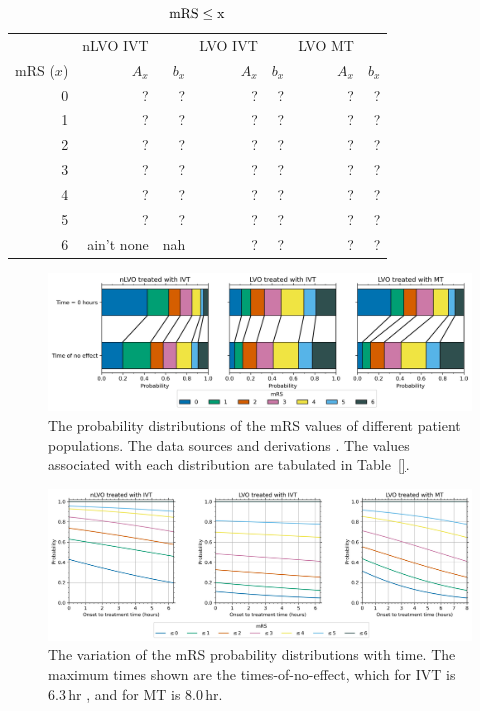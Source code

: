\begin{table}
    \centering
    \begin{tabular}{rrrrrrr}
        \hline 
        & nLVO IVT & & LVO IVT & & LVO MT & \\
        mRS ($x$) & $A_x$ & $b_x$ & $A_x$ & $b_x$ & $A_x$ & $b_x$ \\ 
        \hline 
        0 & ? & ? & ? & ?  & ? & ? \\
        1 & ? & ?  & ? & ?  & ? & ? \\
        2 & ? & ?  & ? & ?  & ? & ? \\
        3 & ? & ?  & ? & ?  & ? & ? \\
        4 & ? & ?  & ? & ?  & ? & ? \\
        5 & ? & ?  & ? & ?  & ? & ? \\
        6 & ain't none & nah & ? & ? & ? & ? \\
        \hline
    \end{tabular}
    \caption{ $\rm{mRS}\leq x$}
    \label{tab:probs_with_time}
\end{table}

\begin{figure}
    \centering
    \includegraphics[width=\columnwidth]{images/dist_bars.jpg}
    \caption{
        The probability distributions of the mRS values of different patient populations. 
        The data sources and derivations .
        The values associated with each distribution are tabulated in Table~\ref{}. 
        }
    \label{fig:dist_bars}
\end{figure}

\begin{figure}
    \centering
    \includegraphics[width=\columnwidth]{images/probs_with_time.jpg}
    \caption{
        The variation of the mRS probability distributions with time.
        The maximum times shown are the times-of-no-effect, which for IVT is 6.3\,hr \cite{emberson_effect_2014},
        and for MT is 8.0\,hr\cite{goyal_endovascular_2016}.
        }
    \label{fig:probs_with_time}
\end{figure}

